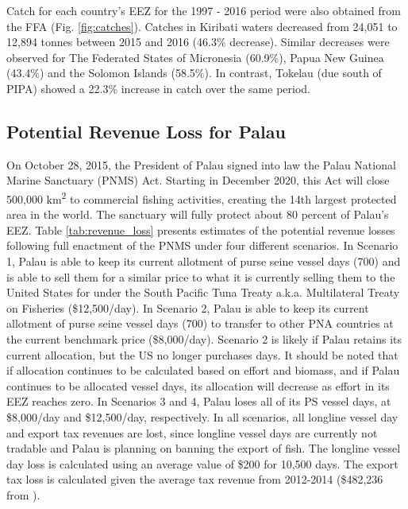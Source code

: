 \documentclass[9p,twocolumn,twoside,lineno]{pnas-new}
\begin{document}
Catch for each country's EEZ for the 1997 - 2016 period were also obtained from the FFA (Fig. \ref{fig:catches}). Catches in Kiribati waters decreased from 24,051 to 12,894 tonnes between 2015 and 2016 (46.3\% decrease). Similar decreases were observed for The Federated States of Micronesia (60.9\%), Papua New Guinea (43.4\%) and the Solomon Islands (58.5\%). In contrast, Tokelau (due south of PIPA) showed a 22.3\% increase in catch over the same period.

\subsection{Potential Revenue Loss for Palau}

On October 28, 2015, the President of Palau signed into law the Palau National Marine Sanctuary (PNMS) Act. Starting in December 2020, this Act will close 500,000 km\textsuperscript{2} to commercial fishing activities, creating the 14th largest protected area in the world. The sanctuary will fully protect about 80 percent of Palau’s EEZ. Table \ref{tab:revenue_loss} presents estimates of the potential revenue losses following full enactment of the PNMS under four different scenarios. In Scenario 1, Palau is able to keep its current allotment of purse seine vessel days (700) and is able to sell them for a similar price to what it is currently selling them to the United States for under the South Pacific Tuna Treaty a.k.a. Multilateral Treaty on Fisheries (\$12,500/day). In Scenario 2, Palau is able to keep its current allotment of purse seine vessel days (700) to transfer to other PNA countries at the current benchmark price (\$8,000/day). Scenario 2 is likely if Palau retains its current allocation, but the US no longer purchases days.  It should be noted that if allocation continues to be calculated based on effort and biomass, and if Palau continues to be allocated vessel days, its allocation will decrease as effort in its EEZ reaches zero. In Scenarios 3 and 4, Palau loses all of its PS vessel days, at \$8,000/day and \$12,500/day, respectively. In all scenarios, all longline vessel day and export tax revenues are lost,
since longline vessel days are currently not tradable and Palau is planning on banning the export of fish. The longline vessel day loss is calculated using an average value of \$200 for 10,500 days. The export tax loss is calculated given the average tax revenue from 2012-2014 (\$482,236  from \cite{Gillett2016}). 


\end{document}
